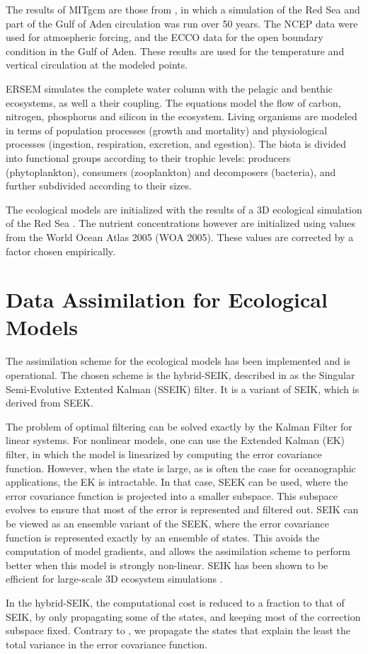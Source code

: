 The results of MITgcm are those from \citet{Yao2014, Yao2014b}, in which a
simulation of the Red Sea and part of the Gulf of Aden circulation was run over
50 years. The NCEP data were used for atmospheric forcing, and the ECCO data
for the open boundary condition in the Gulf of Aden. These results are used for
the temperature and vertical circulation at the modeled points.

ERSEM simulates the complete water column with the pelagic and benthic
ecosystems, as well a their coupling. The equations model the flow of carbon,
nitrogen, phosphorus and silicon in the ecosystem. Living organisms are modeled
in terms of population processes (growth and mortality) and physiological
processes (ingestion, respiration, excretion, and egestion). The biota is
divided into functional groups according to their trophic levels: producers
(phytoplankton), consumers (zooplankton) and decomposers (bacteria), and
further subdivided according to their sizes.

The ecological models are initialized with the results of a 3D ecological
simulation of the Red Sea \citep{Triantafyllou2014}. The nutrient
concentrations however are initialized using values from the World Ocean Atlas
2005 (WOA 2005). These values are corrected by a factor chosen empirically.

\section{Data Assimilation for Ecological Models}

The assimilation scheme for the ecological models has been implemented and is
operational. The chosen scheme is the hybrid-SEIK, described in
\citet{Hoteit2002} as the Singular Semi-Evolutive Extented Kalman (SSEIK)
filter. It is a variant of SEIK, which is derived from SEEK.

The problem of optimal filtering can be solved exactly by the Kalman Filter for
linear systems. For nonlinear models, one can use the Extended Kalman (EK)
filter, in which the model is linearized by computing the error covariance
function.  However, when the state is large, as is often the case for
oceanographic applications, the EK is intractable. In that case, SEEK can be
used, where the error covariance function is projected into a smaller subspace.
This subspace evolves to ensure that most of the error is represented and
filtered out. SEIK can be viewed as an ensemble variant of the SEEK, where the
error covariance function is represented exactly by an ensemble of states. This
avoids the computation of model gradients, and allows the assimilation scheme
to perform better when this model is strongly non-linear. SEIK has been shown
to be efficient for large-scale 3D ecosystem simulations
\citep{Triantfyllou2003}.

In the hybrid-SEIK, the computational cost is reduced to a fraction to that of
SEIK, by only propagating some of the states, and keeping most of the
correction subspace fixed. Contrary to \citet{Hoteit2002}, we propagate the
states that explain the least the total variance in the error covariance
function.
